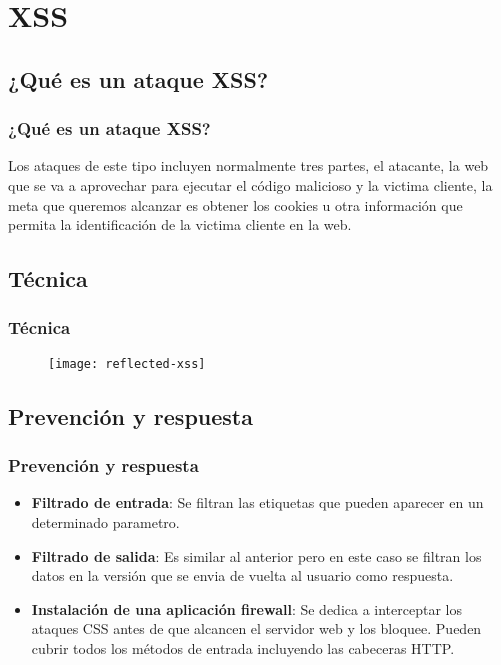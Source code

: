 \documentclass{beamer}
\begin{document}
\section{XSS}
\subsection{¿Qué es un ataque XSS?}
	\begin{frame}
	\frametitle{¿Qué es un ataque XSS?}
		Los ataques de este tipo incluyen normalmente tres partes, el atacante, la web que se va a aprovechar para ejecutar el código malicioso y la victima cliente, la meta que queremos alcanzar es obtener los cookies u otra información que permita la identificación de la victima cliente en la web.

	\end{frame}
\subsection{Técnica}
	\begin{frame}
	\frametitle{Técnica}
		\begin{figure}[H]
		\centering 
		\texttt{[image: reflected-xss]} 
		\vspace{-0.2cm} 
		\label{contexto:figura} 
		\end{figure}
	\end{frame}
\subsection{Prevención y respuesta}
	\begin{frame}
	\frametitle{Prevención y respuesta}
		\begin{itemize}
\item \textbf{Filtrado de entrada}: Se filtran las etiquetas que pueden aparecer en un determinado parametro.
\item \textbf{Filtrado de salida}: Es similar al anterior pero en este caso se filtran los datos en la versión que se envia de vuelta al usuario como respuesta.
\item \textbf{Instalación de una aplicación firewall}: Se dedica a interceptar los ataques CSS antes de que alcancen el servidor web y los bloquee.  Pueden cubrir todos los métodos de entrada incluyendo las cabeceras HTTP.
\end{itemize}
	\end{frame}
	
\end{document}

